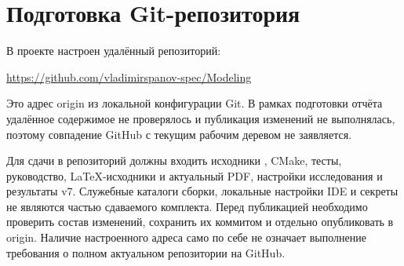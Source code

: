 \section{Подготовка Git-репозитория}
В проекте настроен удалённый репозиторий:
\begin{center}\url{https://github.com/vladimirspanov-spec/Modeling}\end{center}
Это адрес origin из локальной конфигурации Git. В рамках подготовки отчёта удалённое содержимое не проверялось и публикация изменений не выполнялась, поэтому совпадение GitHub с текущим рабочим деревом не заявляется.

Для сдачи в репозиторий должны входить исходники , CMake, тесты, руководство, LaTeX-исходники и актуальный PDF, настройки исследования и результаты v7. Служебные каталоги сборки, локальные настройки IDE и секреты не являются частью сдаваемого комплекта. Перед публикацией необходимо проверить состав изменений, сохранить их коммитом и отдельно опубликовать в origin. Наличие настроенного адреса само по себе не означает выполнение требования о полном актуальном репозитории на GitHub.

